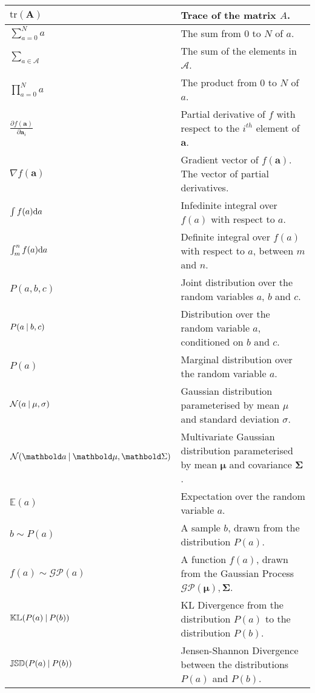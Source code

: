 \begin{longtable}{p{} | p{}}
  \( \text{tr}(\bm{A}) \) & Trace of the matrix \( A \).\\
  \midrule
  \(\sum_{a = 0}^{N} a\) & The sum from \( 0 \) to \( N \) of \( a \).\\
  \(\sum_{a \in \mathcal{A}}\) & The sum of the elements in \( \mathcal{A} \).\\
  \(\prod_{a = 0}^{N} a\) & The product from \( 0 \) to \( N \) of \( a \).\\
  \midrule
  \( \frac{\partial f(\bm{a})}{\partial \bm{a}_{i}} \) & Partial derivative of \( f \) with respect to the \( i^{th} \) element of \( \bm{a} \).\\
  \( \nabla f(\bm{a}) \) & Gradient vector of \( f(\bm{a}) \). The vector of partial derivatives.\\
  \( \int f(a) {\mathrm d{a}} \) & Infedinite integral over \( f(a) \) with respect to \( a \).\\
  \( \int_{m}^{n} f(a) {\mathrm d{a}} \) & Definite integral over \( f(a) \) with respect to \( a \), between \( m \) and \( n \).\\
  \midrule
  \( P(a, b, c) \) & Joint distribution over the random variables \( a \), \( b \) and \( c \).\\
  \( P(a \:\vert\: b, c) \) & Distribution over the random variable \( a \), conditioned on \( b \) and \( c \).\\
  \( P(a) \) & Marginal distribution over the random variable \( a \).\\
  \( \mathcal{N}(a \:\vert\: \mu, \sigma) \) & Gaussian distribution parameterised by mean \( \mu \) and standard deviation \( \sigma \).\\
  \( \mathcal{N}(\bm{a} \given \bm{\mu}, \bm{\Sigma}) \) & Multivariate Gaussian distribution parameterised by mean \( \bm{\mu} \) and covariance \( \bm{\Sigma} \).\\
  \( \mathbb{E}(a) \) & Expectation over the random variable \( a \).\\
  \( b \sim P(a) \) & A sample \( b \), drawn from the distribution \( P(a) \).\\
  \( f(a) \sim \mathcal{GP}(a) \) & A function \( f(a) \), drawn from the Gaussian Process \( \mathcal{GP}(\bm{\mu}), \bm{\Sigma} \).\\
  \( \mathbb{KL}(P(a) \:\vert\: P(b)) \) & KL Divergence from the distribution \( P(a) \) to the distribution \( P(b) \).\\
  \( \mathbb{JSD}(P(a) \:\vert\: P(b)) \) & Jensen-Shannon Divergence between the distributions \( P(a) \) and \( P(b) \).
~\label{table:mathematical_notation}
\end{longtable}

